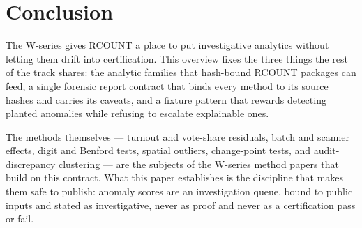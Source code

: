 \section{Conclusion}

The W-series gives RCOUNT a place to put investigative analytics without letting
them drift into certification. This overview fixes the three things the rest of
the track shares: the analytic families that hash-bound RCOUNT packages can
feed, a single forensic report contract that binds every method to its source
hashes and carries its caveats, and a fixture pattern that rewards detecting
planted anomalies while refusing to escalate explainable ones.

The methods themselves --- turnout and vote-share residuals, batch and scanner
effects, digit and Benford tests, spatial outliers, change-point tests, and
audit-discrepancy clustering --- are the subjects of the W-series method papers
that build on this contract. What this paper establishes is the discipline that
makes them safe to publish: anomaly scores are an investigation queue, bound to
public inputs and stated as investigative, never as proof and never as a
certification pass or fail.

